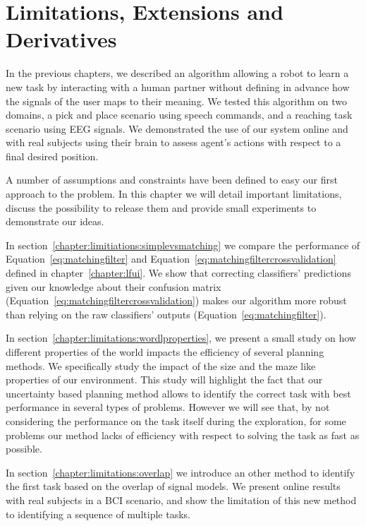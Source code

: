 
%
\chapter{Limitations, Extensions and Derivatives}
\label{chapter:limitations}
\minitoc

In the previous chapters, we described an algorithm allowing a robot to learn a new task by interacting with a human partner without defining in advance how the signals of the user maps to their meaning. We tested this algorithm on two domains, a pick and place scenario using speech commands, and a reaching task scenario using EEG signals. We demonstrated the use of our system online and with real subjects using their brain to assess agent's actions with respect to a final desired position.

A number of assumptions and constraints have been defined to easy our first approach to the problem. In this chapter we will detail important limitations, discuss the possibility to release them and provide small experiments to demonstrate our ideas. 

In section~\ref{chapter:limitiations:simplevsmatching} we compare the performance of Equation~\ref{eq:matchingfilter} and Equation~\ref{eq:matchingfiltercrossvalidation} defined in chapter~\ref{chapter:lfui}. We show that correcting classifiers' predictions given our knowledge about their confusion matrix (Equation~\ref{eq:matchingfiltercrossvalidation}) makes our algorithm more robust than relying on the raw classifiers' outputs (Equation~\ref{eq:matchingfilter}).

In section~\ref{chapter:limitations:wordlproperties}, we present a small study on how different properties of the world impacts the efficiency of several planning methods. We specifically study the impact of the size and the maze like properties of our environment. This study will highlight the fact that our uncertainty based planning method allows to identify the correct task with best performance in several types of problems. However we will see that, by not considering the performance on the task itself during the exploration, for some problems our method lacks of efficiency with respect to solving the task as fast as possible.

In section~\ref{chapter:limitations:overlap} we introduce an other method to identify the first task based on the overlap of signal models. We present online results with real subjects in a BCI scenario, and show the limitation of this new method to identifying a sequence of multiple tasks.

